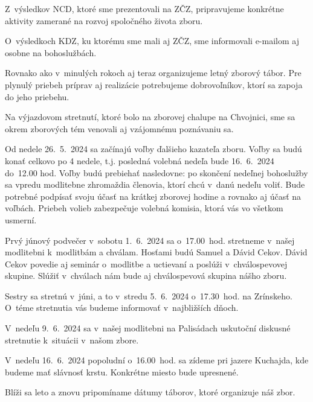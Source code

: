 Z~výsledkov NCD, ktoré sme prezentovali na ZČZ, pripravujeme konkrétne aktivity zamerané na rozvoj spoločného života zboru.

O~výsledkoch KDZ, ku ktorému sme mali aj ZČZ, sme informovali e-mailom aj osobne na bohoslužbách.

Rovnako ako v~minulých rokoch aj teraz organizujeme letný zborový tábor. Pre plynulý priebeh príprav aj realizácie potrebujeme dobrovoľníkov, ktorí sa zapoja do jeho priebehu.

Na výjazdovom stretnutí, ktoré bolo na zborovej chalupe na Chvojnici, sme sa okrem zborových tém venovali aj vzájomnému poznávaniu sa.




Od nedele 26.~5.~2024 sa začínajú voľby ďalšieho kazateľa zboru. Voľby sa budú konať celkovo po 4 nedele, t.j. posledná volebná nedeľa bude 16.~6.~2024 do~12.00 hod.
Voľby budú prebiehať nasledovne: po skončení nedeľnej bohoslužby sa vpredu modlitebne zhromaždia členovia, ktorí chcú v~danú nedeľu voliť. Bude potrebné podpísať svoju účasť na krátkej zborovej hodine a rovnako aj účasť na voľbách. Priebeh volieb zabezpečuje volebná komisia, ktorá vás vo všetkom usmerní.



Prvý júnový podvečer v~sobotu 1.~6.~2024 sa o~17.00~hod. stretneme v~našej modlitebni k~modlitbám a chválam. Hosťami budú Samuel a Dávid Cekov. Dávid Cekov povedie aj seminár o~modlitbe a uctievaní a poslúži v~chválospevovej skupine. Slúžiť v~chválach nám bude aj chválospevová skupina nášho zboru.



Sestry sa stretnú v~júni, a to v~stredu 5.~6.~2024 o~17.30~hod. na Zrínskeho. O~téme stretnutia vás budeme informovať v~najbližších dňoch.



V~nedeľu 9.~6.~2024 sa v~našej modlitebni na Palisádach uskutoční diskusné stretnutie k~situácii v~našom zbore.



V~nedeľu 16.~6.~2024 popoludní o~16.00~hod. sa zídeme pri jazere Kuchajda, kde budeme mať slávnosť krstu. Konkrétne miesto bude upresnené.



Blíži sa leto a znovu pripomíname dátumy táborov, ktoré organizuje náš zbor.

